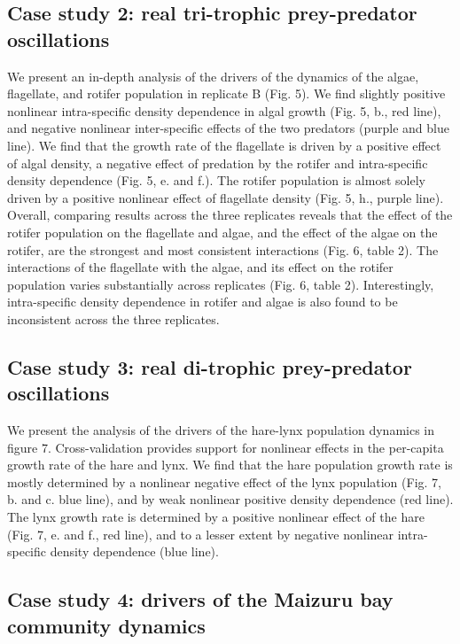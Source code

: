 \documentclass[11pt, oneside]{article}
\begin{document}
\subsection{Case study 2: real tri-trophic prey-predator oscillations}

We present an in-depth analysis of the drivers of the dynamics of the algae, flagellate, and rotifer population in replicate B (Fig. 5).
We find slightly positive nonlinear intra-specific density dependence in algal growth (Fig. 5, b., red line), and negative nonlinear inter-specific effects of the two predators (purple and blue line).
We find that the growth rate of the flagellate is driven by a positive effect of algal density, a negative effect of predation by the rotifer and intra-specific density dependence (Fig. 5, e. and f.).
The rotifer population is almost solely driven by a positive nonlinear effect of flagellate density (Fig. 5, h., purple line).
Overall, comparing results across the three replicates reveals that the effect of the rotifer population on the flagellate and algae, and the effect of the algae on the rotifer, are the strongest and most consistent interactions (Fig. 6, table 2).
The interactions of the flagellate with the algae, and its effect on the rotifer population varies substantially across replicates (Fig. 6, table 2). 
Interestingly, intra-specific density dependence in rotifer and algae is also found to be inconsistent across the three replicates.

\subsection{Case study 3: real di-trophic prey-predator oscillations}

We present the analysis of the drivers of the hare-lynx population dynamics in figure 7.
Cross-validation provides support for nonlinear effects in the per-capita growth rate of the hare and lynx.
We find that the hare population growth rate is mostly determined by a nonlinear negative effect of the lynx population (Fig. 7, b. and c. blue line), and by weak nonlinear positive density dependence (red line). 
The lynx growth rate is determined by a positive nonlinear effect of the hare (Fig. 7, e. and f., red line), and to a lesser extent by negative nonlinear intra-specific density dependence (blue line).

\subsection{Case study 4: drivers of the Maizuru bay community dynamics}
\end{document}
